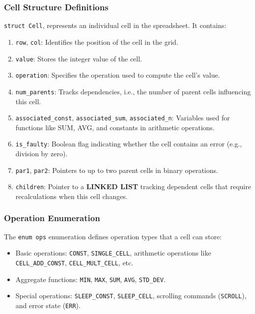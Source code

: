 \documentclass{report}
\begin{document}
\subsubsection*{Cell Structure Definitions}
\texttt{struct Cell}, represents an individual cell in the spreadsheet. It contains:
\begin{enumerate}
    
    \item \texttt{row}, \texttt{col}: Identifies the position of the cell in the grid.
    \item \texttt{value}: Stores the integer value of the cell.
    \item \texttt{operation}: Specifies the operation used to compute the cell’s value.
    \item \texttt{num\_parents}: Tracks dependencies, i.e., the number of parent cells influencing this cell.
    \item \texttt{associated\_const}, \texttt{associated\_sum}, \texttt{associated\_n}: Variables used for functions like SUM, AVG, and constants in arithmetic operations.
    \item \texttt{is\_faulty}: Boolean flag indicating whether the cell contains an error (e.g., division by zero).
    \item \texttt{par1}, \texttt{par2}: Pointers to up to two parent cells in binary operations.
    \item \texttt{children}: Pointer to a \textbf{LINKED LIST} tracking dependent cells that require recalculations when this cell changes.
\end{enumerate}

\subsubsection*{Operation Enumeration}
The \texttt{enum ops} enumeration defines operation types that a cell can store:
\begin{itemize}
    \item Basic operations: \texttt{CONST}, \texttt{SINGLE\_CELL}, arithmetic operations like \texttt{CELL\_ADD\_CONST}, \texttt{CELL\_MULT\_CELL}, etc.
    \item Aggregate functions: \texttt{MIN}, \texttt{MAX}, \texttt{SUM}, \texttt{AVG}, \texttt{STD\_DEV}.
    \item Special operations: \texttt{SLEEP\_CONST}, \texttt{SLEEP\_CELL}, scrolling commands (\texttt{SCROLL}), and error state (\texttt{ERR}).
\end{itemize}
\end{document}
